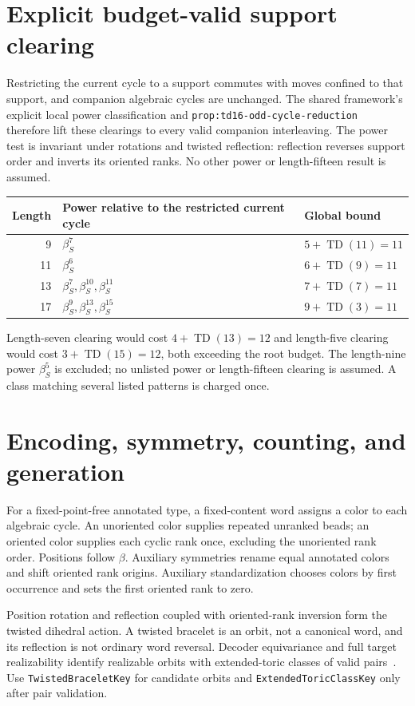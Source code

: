 \documentclass[11pt,a4paper]{article}
\newcommand{\TD}{\operatorname{TD}}
\begin{document}
\section{Explicit budget-valid support clearing}
Restricting the current cycle to a support commutes with moves confined to that
support, and companion algebraic cycles are unchanged. The shared framework's
explicit local power classification and
\nolinkurl{prop:td16-odd-cycle-reduction}~\cite{framework} therefore lift these
clearings to every valid companion interleaving. The power test is invariant
under rotations and twisted reflection: reflection reverses support order and
inverts its oriented ranks. No other power or length-fifteen result is assumed.
\begin{center}\begin{tabular}{@{}rll@{}}\toprule
Length & Power relative to the restricted current cycle & Global bound\\\midrule
9 & $\beta_S^7$ & $5+\TD(11)=11$\\
11 & $\beta_S^6$ & $6+\TD(9)=11$\\
13 & $\beta_S^7,\beta_S^{10},\beta_S^{11}$ & $7+\TD(7)=11$\\
17 & $\beta_S^9,\beta_S^{13},\beta_S^{15}$ & $9+\TD(3)=11$\\
\bottomrule\end{tabular}\end{center}
Length-seven clearing would cost $4+\TD(13)=12$ and length-five clearing
would cost $3+\TD(15)=12$, both exceeding the root budget. The length-nine
power $\beta_S^5$ is excluded; no unlisted power or length-fifteen clearing
is assumed. A class matching several listed patterns is charged once.

\section{Encoding, symmetry, counting, and generation}
For a fixed-point-free annotated type, a fixed-content word assigns a color to
each algebraic cycle. An unoriented color supplies repeated unranked beads;
an oriented color supplies each cyclic rank once, excluding the unoriented
rank order. Positions follow $\beta$. Auxiliary symmetries rename equal
annotated colors and shift oriented rank origins. Auxiliary standardization
chooses colors by first occurrence and sets the first oriented rank to zero.

Position rotation and reflection coupled with oriented-rank inversion form the
twisted dihedral action. A twisted bracelet is an orbit, not a canonical word,
and its reflection is not ordinary word reversal. Decoder equivariance and full
target realizability identify realizable orbits with extended-toric classes of
valid pairs~\cite{framework}. Use \nolinkurl{TwistedBraceletKey} for candidate
orbits and \nolinkurl{ExtendedToricClassKey} only after pair validation.
\end{document}
